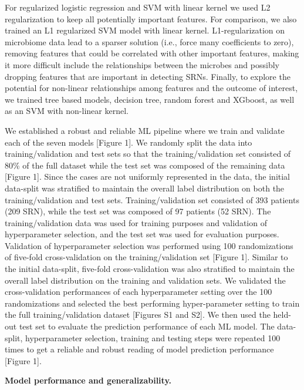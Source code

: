 \documentclass[11pt,]{article}
\begin{document}
For regularized logistic regression and SVM with linear kernel we used
L2 regularization to keep all potentially important features. For
comparison, we also trained an L1 regularized SVM model with linear
kernel. L1-regularization on microbiome data lead to a sparser solution
(i.e., force many coefficients to zero), removing features that could be
correlated with other important features, making it more difficult
include the relationships between the microbes and possibly dropping
features that are important in detecting SRNs. Finally, to explore the
potential for non-linear relationships among features and the outcome of
interest, we trained tree based models, decision tree, random forest and
XGboost, as well as an SVM with non-linear kernel.

We established a robust and reliable ML pipeline where we train and
validate each of the seven models {[}Figure 1{]}. We randomly split the
data into training/validation and test sets so that the
training/validation set consisted of 80\% of the full dataset while the
test set was composed of the remaining data {[}Figure 1{]}. Since the
cases are not uniformly represented in the data, the initial data-split
was stratified to maintain the overall label distribution on both the
training/validation and test sets. Training/validation set consisted of
393 patients (209 SRN), while the test set was composed of 97 patients
(52 SRN). The training/validation data was used for training purposes
and validation of hyperparameter selection, and the test set was used
for evaluation purposes. Validation of hyperparameter selection was
performed using 100 randomizations of five-fold cross-validation on the
training/validation set {[}Figure 1{]}. Similar to the initial
data-split, five-fold cross-validation was also stratified to maintain
the overall label distribution on the training and validation sets. We
validated the cross-validation performances of each hyperparameter
setting over the 100 randomizations and selected the best performing
hyper-parameter setting to train the full training/validation dataset
{[}Figures S1 and S2{]}. We then used the held-out test set to evaluate
the prediction performance of each ML model. The data-split,
hyperparameter selection, training and testing steps were repeated 100
times to get a reliable and robust reading of model prediction
performance {[}Figure 1{]}.

\textbf{Model performance and generalizability.}
\end{document}
